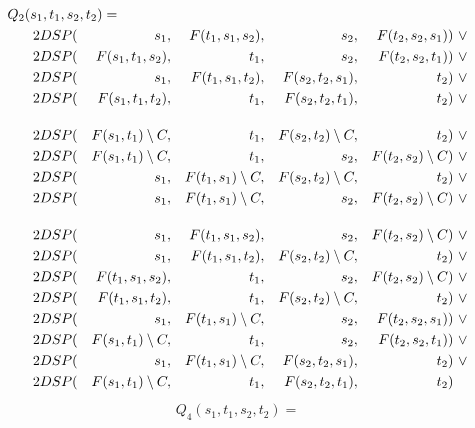 \begin{theorem}
\begin{enumerate}
\begin{align}
Q_2(s_1, t_1, s_2, t_2) =\hspace{-1cm}\\
    2DSP(&& s_1              ,&& F(t_1, s_1, s_2) ,&& s_2              ,&& F(t_2, s_2, s_1) &)~\vee \\
    2DSP(&& F(s_1, t_1, s_2) ,&& t_1              ,&& s_2              ,&& F(t_2, s_2, t_1) &)~\vee \\
    2DSP(&& s_1              ,&& F(t_1, s_1, t_2) ,&& F(s_2, t_2, s_1) ,&& t_2              &)~\vee \\
    2DSP(&& F(s_1, t_1, t_2) ,&& t_1              ,&& F(s_2, t_2, t_1) ,&& t_2              &)~\vee \\[0.4cm]
    2DSP(&& F(s_1, t_1) \sm C,&& t_1              ,&& F(s_2, t_2) \sm C,&& t_2              &)~\vee \\ 
    2DSP(&& F(s_1, t_1) \sm C,&& t_1              ,&& s_2              ,&& F(t_2, s_2) \sm C&)~\vee \\ 
    2DSP(&& s_1              ,&& F(t_1, s_1) \sm C,&& F(s_2, t_2) \sm C,&& t_2              &)~\vee \\ 
    2DSP(&& s_1              ,&& F(t_1, s_1) \sm C,&& s_2              ,&& F(t_2, s_2) \sm C&)~\vee \\[0.4cm]
    2DSP(&& s_1              ,&& F(t_1, s_1, s_2) ,&& s_2              ,&& F(t_2, s_2) \sm C&)~\vee \\
    2DSP(&& s_1              ,&& F(t_1, s_1, t_2) ,&& F(s_2, t_2) \sm C,&& t_2              &)~\vee \\
    2DSP(&& F(t_1, s_1, s_2) ,&& t_1              ,&& s_2              ,&& F(t_2, s_2) \sm C&)~\vee \\
    2DSP(&& F(t_1, s_1, t_2) ,&& t_1              ,&& F(s_2, t_2) \sm C,&& t_2              &)~\vee \\
    2DSP(&& s_1              ,&& F(t_1, s_1) \sm C,&& s_2              ,&& F(t_2, s_2, s_1) &)~\vee \\
    2DSP(&& F(s_1, t_1) \sm C,&& t_1              ,&& s_2              ,&& F(t_2, s_2, t_1) &)~\vee \\
    2DSP(&& s_1              ,&& F(t_1, s_1) \sm C,&& F(s_2, t_2, s_1) ,&& t_2              &)~\vee \\
    2DSP(&& F(s_1, t_1) \sm C,&& t_1              ,&& F(s_2, t_2, t_1) ,&& t_2              &) \label{eq:Q2}
\end{align}
\begin{align}
    Q_4(s_1, t_1, s_2, t_2) = \quad

\end{align}
\end{enumerate}
\end{theorem}

